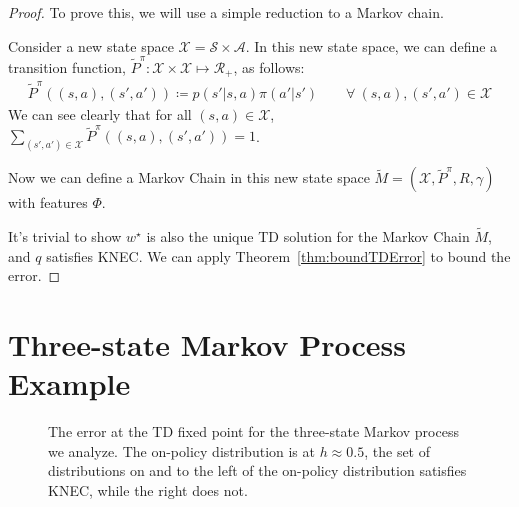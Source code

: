 \begin{proof}

  To prove this, we will use a simple reduction to a Markov chain.

  Consider a new state space $\mathcal{X} = \mathcal{S} \times \mathcal{A}$.
  In this new state space, we can define a transition function, $\tilde{P}^\pi : \mathcal{X} \times \mathcal{X} \mapsto \mathcal{R}_+$, as follows:
  \begin{align*}
    \tilde{P}^\pi((s, a), (s', a')) \coloneqq p(s'|s, a) \pi(a'|s') \quad \quad \forall \ (s, a), (s', a') \in \mathcal{X}
  \end{align*}
  We can see clearly that for all $(s, a) \in \mathcal{X}$, $\sum_{(s', a') \in \mathcal{X}} \tilde{P}^\pi((s, a), (s', a')) = 1$.

  Now we can define a Markov Chain in this new state space $\tilde{M} = (\mathcal{X}, \tilde{P}^\pi, R, \gamma)$ with features $\Phi$.

  It's trivial to show $w^\star$ is also the unique TD solution for the Markov Chain $\tilde{M}$,
  and $q$ satisfies KNEC. We can apply Theorem~\ref{thm:boundTDError} to bound the error.

\end{proof}


\section{Three-state Markov Process Example}
\label{app:threestate}



\begin{figure}[t]
  \centering
  
  \caption{The error at the TD fixed point for the three-state Markov process we analyze. The on-policy distribution is at $h\approx0.5$, the set of distributions on and to the left of the on-policy distribution satisfies KNEC, while the right does not. }
  \label{fig:threestatefixedpoint}
\end{figure}


